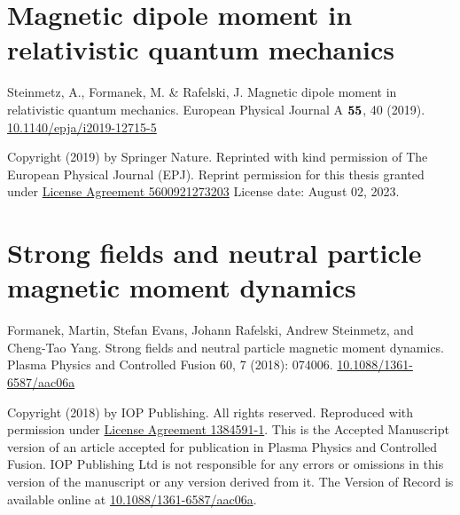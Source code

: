 \chapter{Magnetic dipole moment in relativistic quantum mechanics}
\label{appendixA}
\begin{center}
Steinmetz, A., Formanek, M. \& Rafelski, J. Magnetic dipole moment in relativistic quantum mechanics. European Physical Journal A $\boldsymbol{55}$, 40 (2019). \href{https://doi.org/10.1140/epja/i2019-12715-5}{10.1140/epja/i2019-12715-5}
\end{center}

\noindent Copyright (2019) by Springer Nature. Reprinted with kind permission of The European Physical Journal (EPJ). Reprint permission for this thesis granted under \href{https://s100.copyright.com/CustomerAdmin/PLF.jsp?ref=9a7a42d0-4511-4427-8acd-73a16083772c}{License Agreement 5600921273203} License date: August 02, 2023.



\chapter{Strong fields and neutral particle magnetic moment dynamics}
\label{appendixB}
\begin{center}
Formanek, Martin, Stefan Evans, Johann Rafelski, Andrew Steinmetz, and Cheng-Tao Yang. Strong fields and neutral particle magnetic moment dynamics. Plasma Physics and Controlled Fusion 60, 7 (2018): 074006. \href{https://doi.org/10.1088/1361-6587/aac06a}{10.1088/1361-6587/aac06a}
\end{center}

\noindent Copyright (2018) by IOP Publishing. All rights reserved. Reproduced with permission under \href{https://marketplace.copyright.com/rs-ui-web/mp/license/56222509-d3e0-45fd-8ba6-f519e90d4d18/3a89c359-de4e-466f-93c3-ef1135413aab}{License Agreement 1384591-1}. This is the Accepted Manuscript version of an article accepted for publication in Plasma Physics and Controlled Fusion. IOP Publishing Ltd is not responsible for any errors or omissions in this version of the manuscript or any version derived from it. The Version of Record is available online at \href{https://doi.org/10.1088/1361-6587/aac06a}{10.1088/1361-6587/aac06a}.

